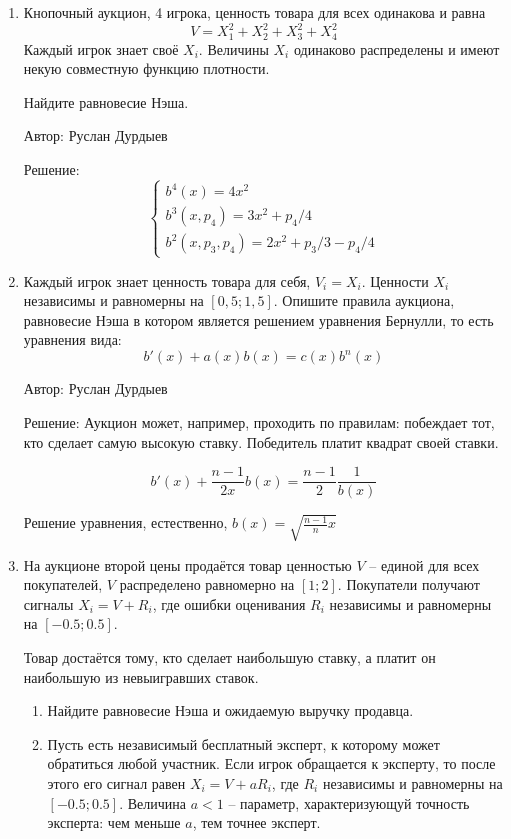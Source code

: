\begin{enumerate}
\item Кнопочный аукцион, 4 игрока, ценность товара для всех одинакова и равна
\begin{equation}
V=X_{1}^{2}+X_{2}^{2}+X_{3}^{2}+X_{4}^{2}
\end{equation}
Каждый игрок знает своё $X_{i}$. Величины $X_{i}$ одинаково распределены и имеют некую совместную функцию плотности.

Найдите равновесие Нэша.

Автор: Руслан Дурдыев

Решение:
\begin{equation}
\begin{cases}
b^{4}(x)=4x^{2} \\
b^{3}(x,p_{4})=3x^{2}+p_{4}/4 \\
b^{2}(x,p_{3},p_{4})=2x^{2}+p_{3}/3-p_{4}/4
\end{cases}
\end{equation}

\item Каждый игрок знает ценность товара для себя, $V_{i}=X_{i}$. Ценности $X_{i}$ независимы и равномерны на $[0,5;1,5]$. Опишите правила аукциона, равновесие Нэша в котором является решением уравнения Бернулли, то есть уравнения вида:
\begin{equation}
b'(x)+a(x)b(x)=c(x)b^{n}(x)
\end{equation}

Автор: Руслан Дурдыев

Решение: Аукцион может, например, проходить по правилам: побеждает тот, кто сделает самую высокую ставку. Победитель платит квадрат своей ставки.

\begin{equation}
b'(x)+\frac{n-1}{2x}b(x)=\frac{n-1}{2}\frac{1}{b(x)}
\end{equation}

Решение уравнения, естественно, $b(x)=\sqrt{\frac{n-1}{n}x}$

\item На аукционе второй цены продаётся товар ценностью $V$ -- единой для всех покупателей, $V$ распределено равномерно на $[1;2]$. Покупатели получают сигналы $X_{i}=V+R_{i}$, где ошибки оценивания $R_{i}$ независимы и равномерны на $[-0.5;0.5]$.

Товар достаётся тому, кто сделает наибольшую ставку, а платит он наибольшую из невыигравших ставок.

\begin{enumerate}
\item Найдите равновесие Нэша и ожидаемую выручку продавца.
\item Пусть есть независимый бесплатный эксперт, к которому может обратиться любой участник. Если игрок обращается к эксперту, то после этого его сигнал равен $X_{i}=V+aR_{i}$, где $R_{i}$ независимы и равномерны на $[-0.5;0.5]$. Величина $a<1$ -- параметр, характеризующуй точность эксперта: чем меньше $a$, тем точнее эксперт.


\end{enumerate}
\end{enumerate}
